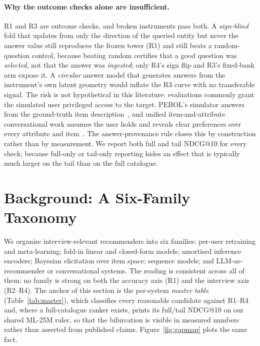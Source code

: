 \documentclass[acmsmall,review,anonymous]{acmart}
\begin{document}
\paragraph{Why the outcome checks alone are insufficient.} R1 and R3 are outcome checks, and broken instruments pass both. A \emph{sign-blind} fold that updates from only the direction of the queried entity but never the answer value still reproduces the frozen tower (R1) and still beats a random-question control, because beating random certifies that a good question was \emph{selected}, not that the answer was \emph{ingested}; only R4's sign flip and R3's fixed-bank arm expose it. A \emph{circular} answer model that generates answers from the instrument's own latent geometry would inflate the R3 curve with no transferable signal. The risk is not hypothetical in this literature: evaluations commonly grant the simulated user privileged access to the target. PEBOL's simulator answers from the ground-truth item description~\citep{austin2024bayesian}, and unified item-and-attribute conversational work assumes the user holds and reveals clear preferences over every attribute and item~\citep{deng2021unicorn}. The answer-provenance rule closes this by construction rather than by measurement. We report both full and tail NDCG@10 for every check, because full-only or tail-only reporting hides an effect that is typically much larger on the tail than on the full catalogue.

\section{Background: A Six-Family Taxonomy}\label{sec:related}

We organise interview-relevant recommenders into six families: per-user retraining and meta-learning; fold-in linear and closed-form models; amortised inference encoders; Bayesian elicitation over item space; sequence models; and LLM-as-recommender or conversational systems. The reading is consistent across all of them: no family is strong on both the accuracy axis (R1) and the interview axis (R2--R4). The anchor of this section is the per-system \emph{master table} (Table~\ref{tab:master}), which classifies every reasonable candidate against R1--R4 and, where a full-catalogue ranker exists, prints its full/tail NDCG@10 on our shared ML-25M ruler, so that the bifurcation is visible in measured numbers rather than asserted from published claims. Figure~\ref{fig:gapmap} plots the same fact.
\end{document}
